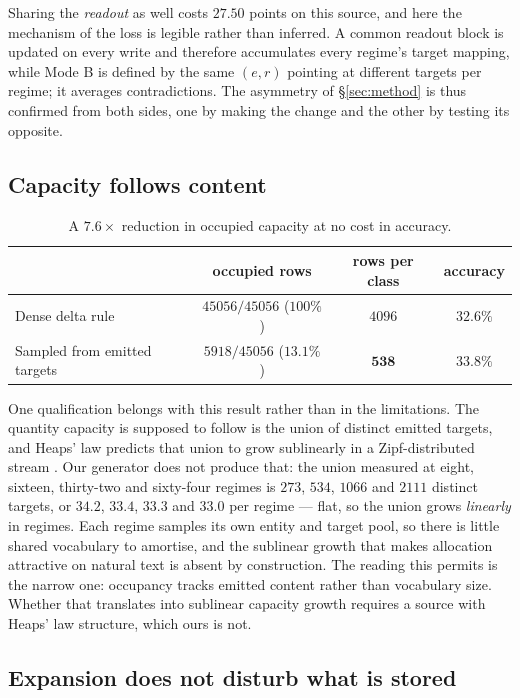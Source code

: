 \documentclass[11pt,a4paper]{article}
\begin{document}
Sharing the \emph{readout} as well costs $27.50$ points on this source, and
here the mechanism of the loss is legible rather than inferred. A common readout block
is updated on every write and therefore accumulates every regime's target
mapping, while Mode B is defined by the same $(e,r)$ pointing at different
targets per regime; it averages contradictions. The asymmetry of
\S\ref{sec:method} is thus confirmed from both sides, one by making the change
and the other by testing its opposite.

\subsection{Capacity follows content}
\label{sec:capacity}

\begin{table}[h]
\centering
\begin{tabular}{lccc}
\toprule
 & occupied rows & rows per class & accuracy \\
\midrule
Dense delta rule & $45056/45056$ ($100\%$) & $4096$ & $32.6\%$ \\
Sampled from emitted targets & $5918/45056$ ($\mathbf{13.1\%}$) & $\mathbf{538}$ & $33.8\%$ \\
\bottomrule
\end{tabular}
\caption{A $7.6\times$ reduction in occupied capacity at no cost in accuracy.}
\end{table}

One qualification belongs with this result rather than in the limitations. The
quantity capacity is supposed to follow is the union of distinct emitted
targets, and Heaps' law predicts that union to grow sublinearly in a
Zipf-distributed stream \citep{heaps1978information}. Our generator does not
produce that: the union measured at eight, sixteen, thirty-two and sixty-four
regimes is $273$, $534$, $1066$ and $2111$ distinct targets, or $34.2$, $33.4$,
$33.3$ and $33.0$ per regime --- flat, so the union grows \emph{linearly} in
regimes. Each regime samples its own entity and target pool, so there is little
shared vocabulary to amortise, and the sublinear growth that makes allocation
attractive on natural text is absent by construction. The reading this permits
is the narrow one: occupancy tracks emitted content rather than vocabulary
size. Whether that translates into sublinear capacity growth requires a source
with Heaps' law structure, which ours is not.

\subsection{Expansion does not disturb what is stored}
\label{sec:expansion}
\end{document}
